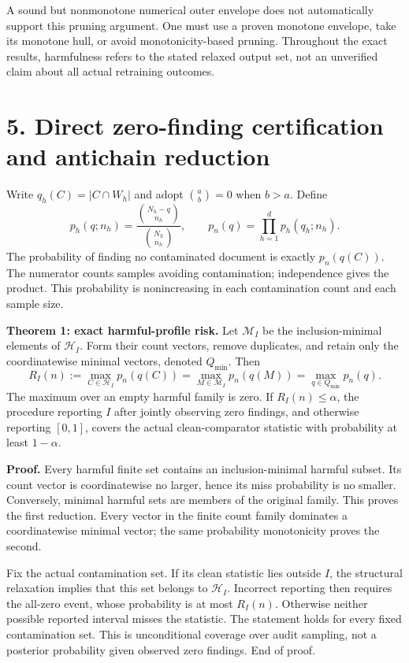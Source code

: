 \documentclass[11pt]{article}
\begin{document}
A sound but nonmonotone numerical outer envelope does not automatically support this pruning argument. One must use a proven monotone envelope, take its monotone hull, or avoid monotonicity-based pruning. Throughout the exact results, harmfulness refers to the stated relaxed output set, not an unverified claim about all actual retraining outcomes.

\section*{5. Direct zero-finding certification and antichain reduction}

Write $q_h(C)=|C\cap W_h|$ and adopt $\binom ab=0$ when $b>a$. Define
\[
p_h(q;n_h)=\frac{\binom{N_h-q}{n_h}}{\binom{N_h}{n_h}},
\qquad
p_n(q)=\prod_{h=1}^{d}p_h(q_h;n_h).
\]
The probability of finding no contaminated document is exactly $p_n(q(C))$. The numerator counts samples avoiding contamination; independence gives the product. This probability is nonincreasing in each contamination count and each sample size.

\textbf{Theorem 1: exact harmful-profile risk.} Let $\mathcal M_I$ be the inclusion-minimal elements of $\mathcal H_I$. Form their count vectors, remove duplicates, and retain only the coordinatewise minimal vectors, denoted $Q_{\min}$. Then
\[
R_I(n):=\max_{C\in\mathcal H_I}p_n(q(C))
=\max_{M\in\mathcal M_I}p_n(q(M))
=\max_{q\in Q_{\min}}p_n(q).
\]
The maximum over an empty harmful family is zero. If $R_I(n)\le\alpha$, the procedure reporting $I$ after jointly observing zero findings, and otherwise reporting $[0,1]$, covers the actual clean-comparator statistic with probability at least $1-\alpha$.

\textbf{Proof.} Every harmful finite set contains an inclusion-minimal harmful subset. Its count vector is coordinatewise no larger, hence its miss probability is no smaller. Conversely, minimal harmful sets are members of the original family. This proves the first reduction. Every vector in the finite count family dominates a coordinatewise minimal vector; the same probability monotonicity proves the second.

Fix the actual contamination set. If its clean statistic lies outside $I$, the structural relaxation implies that this set belongs to $\mathcal H_I$. Incorrect reporting then requires the all-zero event, whose probability is at most $R_I(n)$. Otherwise neither possible reported interval misses the statistic. The statement holds for every fixed contamination set. This is unconditional coverage over audit sampling, not a posterior probability given observed zero findings. End of proof.
\end{document}
